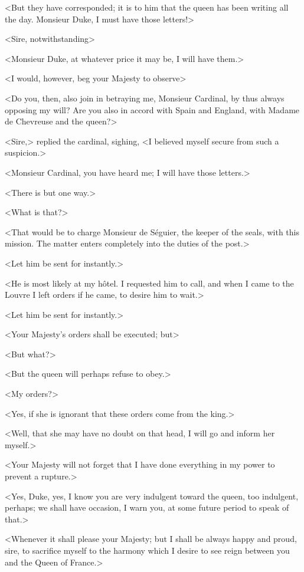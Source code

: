 <But they have corresponded; it is to him that the queen has been writing all the day. Monsieur Duke, I must have those letters!> 

<Sire, notwithstanding\longdash> 

<Monsieur Duke, at whatever price it may be, I will have them.> 

<I would, however, beg your Majesty to observe\longdash> 

<Do you, then, also join in betraying me, Monsieur Cardinal, by thus always opposing my will? Are you also in accord with Spain and England, with Madame de Chevreuse and the queen?> 

<Sire,> replied the cardinal, sighing, <I believed myself secure from such a suspicion.> 

<Monsieur Cardinal, you have heard me; I will have those letters.> 

<There is but one way.> 

<What is that?> 

<That would be to charge Monsieur de Séguier, the keeper of the seals, with this mission. The matter enters completely into the duties of the post.> 

<Let him be sent for instantly.> 

<He is most likely at my hôtel. I requested him to call, and when I came to the Louvre I left orders if he came, to desire him to wait.> 

<Let him be sent for instantly.> 

<Your Majesty's orders shall be executed; but\longdash> 

<But what?> 

<But the queen will perhaps refuse to obey.> 

<My orders?> 

<Yes, if she is ignorant that these orders come from the king.> 

<Well, that she may have no doubt on that head, I will go and inform her myself.> 

<Your Majesty will not forget that I have done everything in my power to prevent a rupture.> 

<Yes, Duke, yes, I know you are very indulgent toward the queen, too indulgent, perhaps; we shall have occasion, I warn you, at some future period to speak of that.> 

<Whenever it shall please your Majesty; but I shall be always happy and proud, sire, to sacrifice myself to the harmony which I desire to see reign between you and the Queen of France.> 

